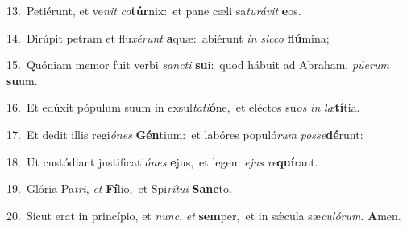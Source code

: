 {\numbfont\textcolor{\numbcolor}{13.}}~Petiérunt, et ve\textit{nit} \textit{co}\-\textbf{túr}nix:~\star et pane cæli sa\-\textit{tu}\-\textit{rá}\textit{vit} \textbf{e}\-os.\par
{\numbfont\textcolor{\numbcolor}{14.}}~Dirúpit petram et flu\-\textit{xé}\-\textit{runt} \textbf{a}\-quæ:~\star abiérunt \textit{in} \textit{sic}\-\textit{co} \textbf{flú}\-mina;\par
{\numbfont\textcolor{\numbcolor}{15.}}~Quóniam memor fuit verbi \textit{sanc}\-\textit{ti} \textbf{su}\-i:~\star quod hábuit ad Abraham, \textit{pú}\-\textit{e}\textit{rum} \textbf{su}\-um.\par
{\numbfont\textcolor{\numbcolor}{16.}}~Et edúxit pópulum suum in exsul\-\textit{ta}\-\textit{ti}\textbf{ó}ne,~\star et eléctos su\textit{os} \textit{in} \textit{læ}\-\textbf{tí}tia.\par
{\numbfont\textcolor{\numbcolor}{17.}}~Et dedit illis regi\-\textit{ó}\-\textit{nes} \textbf{Gén}\-tium:~\star et labóres populó\textit{rum} \textit{pos}\-\textit{se}\textbf{dé}runt:\par
{\numbfont\textcolor{\numbcolor}{18.}}~Ut custódiant justificati\-\textit{ó}\-\textit{nes} \textbf{e}\-jus,~\star et legem \textit{e}\-\textit{jus} \textit{re}\-\textbf{quí}rant.\par
{\numbfont\textcolor{\numbcolor}{19.}}~Glória Pa\-\textit{tri}\-, \textit{et} \textbf{Fí}\-lio,~\star et Spi\-\textit{rí}\-\textit{tu}\textit{i} \textbf{Sanc}\-to.\par
{\numbfont\textcolor{\numbcolor}{20.}}~Sicut erat in princípio, et \textit{nunc}\-, \textit{et} \textbf{sem}\-per,~\star et in sǽcula sæ\-\textit{cu}\-\textit{ló}\textit{rum}. \textbf{A}\-men.\par
